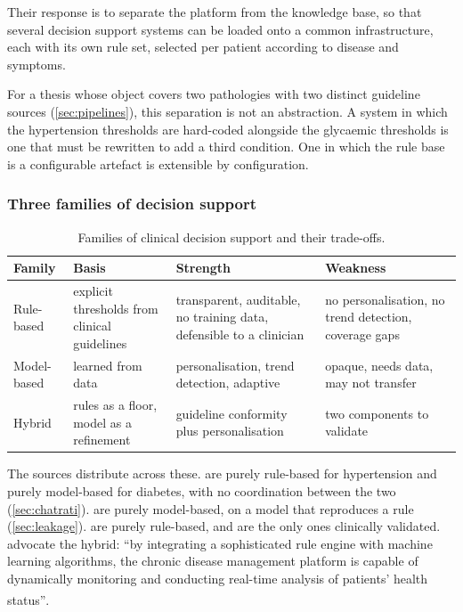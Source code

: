 \documentclass[12pt,a4paper,oneside]{report}
\newcommand{\bq}[1]{``#1''\textsuperscript{\dag}}
\begin{document}
Their response is to separate the platform from the knowledge base, so that several decision support systems can be loaded onto a common infrastructure, each with its own rule set, selected per patient according to disease and symptoms.

For a thesis whose object covers two pathologies with two distinct guideline sources (\cref{sec:pipelines}), this separation is not an abstraction. A system in which the hypertension thresholds are hard-coded alongside the glycaemic thresholds is one that must be rewritten to add a third condition. One in which the rule base is a configurable artefact is extensible by configuration.

\subsubsection{Three families of decision support}

\begin{table}[htbp]
\centering\footnotesize
\caption{Families of clinical decision support and their trade-offs.}\label{tab:cdss-families}
\begin{tabularx}{\textwidth}{@{}>{\raggedright\arraybackslash}p{2.0cm} >{\raggedright\arraybackslash}p{3.2cm} >{\raggedright\arraybackslash}X >{\raggedright\arraybackslash}X@{}}
\toprule
\textbf{Family} & \textbf{Basis} & \textbf{Strength} & \textbf{Weakness} \\
\midrule
Rule-based & explicit thresholds from clinical guidelines & transparent, auditable, no training data, defensible to a clinician & no personalisation, no trend detection, coverage gaps \\
Model-based & learned from data & personalisation, trend detection, adaptive & opaque, needs data, may not transfer \\
Hybrid & rules as a floor, model as a refinement & guideline conformity plus personalisation & two components to validate \\
\bottomrule
\end{tabularx}
\end{table}

The sources distribute across these. \Textcite{chatrati2022} are purely rule-based for hypertension and purely model-based for diabetes, with no coordination between the two (\cref{sec:chatrati}). \Textcite{efendi2025} are purely model-based, on a model that reproduces a rule (\cref{sec:leakage}). \Textcite{mihevc2025} are purely rule-based, and are the only ones clinically validated. \Textcite{liu2025review} advocate the hybrid: \bq{by integrating a sophisticated rule engine with machine learning algorithms, the chronic disease management platform is capable of dynamically monitoring and conducting real-time analysis of patients' health status}.
\end{document}
